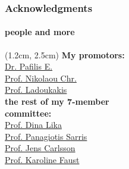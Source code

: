 \documentclass{beamer}
\begin{document}
   \begin{darkframes}

   \begin{frame}

      \frametitle{Acknowledgments}
      \framesubtitle{people and more}

      \begin{textblock*}{4.0cm}(1.2cm, 2.5cm)
         \footnotesize
         \textbf{My promotors: }\\
            \href{http://lab42open.hcmr.gr/people/evangelospafilis/}{Dr. Pafilis E.} \\
            \href{http://computational-genomics.weebly.com/}{Prof. Nikolaou Chr.} \\
            \href{https://ladoukakis.weebly.com/}{Prof. Ladoukakis} \\
         \bigskip
         \textbf{the rest of my 7-member \\ committee:} \\
            \href{http://www.biology.uoc.gr/labweb/lika/}{Prof. Dina Lika} \\
            \href{https://www.biology.uoc.gr/el/personnel/7714}{Prof. Panagiotis Sarris} \\
            \href{https://sites.google.com/view/lab-area52}{Prof. Jens Carlsson} \\
            \href{http://msysbiology.com/}{Prof. Karoline Faust} \\

      \end{textblock*}




\end{frame}
\end{darkframes}
\end{document}
